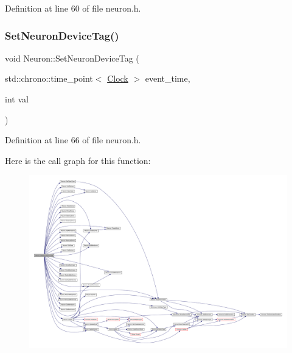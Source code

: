 Definition at line 60 of file neuron.\+h.

\mbox{\label{class_neuron_aa06d0f1a129e4a901a60e7343bc43533}} 
\subsubsection{\texorpdfstring{Set\+Neuron\+Device\+Tag()}{SetNeuronDeviceTag()}}
{\footnotesize\ttfamily void Neuron\+::\+Set\+Neuron\+Device\+Tag (\begin{DoxyParamCaption}\item[{std\+::chrono\+::time\+\_\+point$<$ \hyperlink{universe_8h_a0ef8d951d1ca5ab3cfaf7ab4c7a6fd80}{Clock} $>$}]{event\+\_\+time,  }\item[{int}]{val }\end{DoxyParamCaption})\hspace{0.3cm}{\ttfamily [inline]}}



Definition at line 66 of file neuron.\+h.

Here is the call graph for this function\+:
\nopagebreak
\begin{figure}[H]
\begin{center}
\leavevmode
\includegraphics[width=350pt]{class_neuron_aa06d0f1a129e4a901a60e7343bc43533_cgraph}
\end{center}
\end{figure}
\mbox{\label{class_neuron_afc685a0444425fceab6685a6ee004b65}} 
